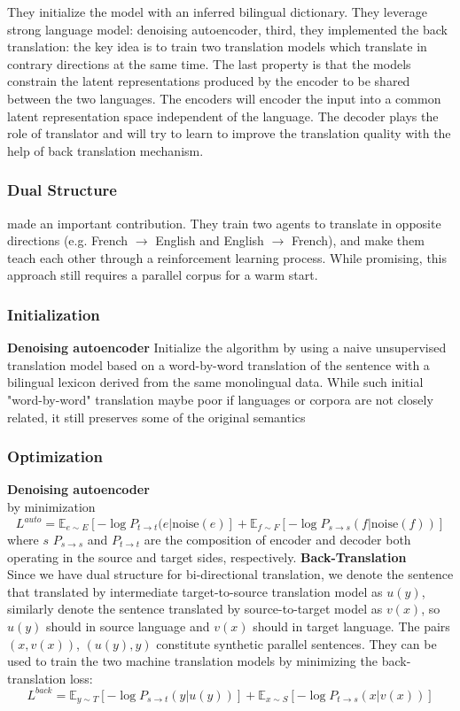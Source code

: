 They initialize the model with an inferred bilingual dictionary. They leverage strong language model: denoising autoencoder,  third, they implemented the back translation: the key idea is to train two translation models which translate in contrary directions at the same time. The last property is that the models constrain the latent representations produced by the encoder to be shared between the two languages. The encoders will encoder the input into a common latent representation space independent of the language. The decoder plays the role of translator and will try to learn to improve the translation quality with the help of back translation mechanism.

\subsubsection{Dual Structure}
made an important contribution. They train two agents to translate in opposite directions (e.g. French $\rightarrow$ English and English $\rightarrow$ French), and make them teach each other through a reinforcement learning process. While promising, this approach still requires a parallel corpus for a warm start.

\subsubsection{Initialization}
\textbf{Denoising autoencoder} Initialize the algorithm by using a naive unsupervised translation model based on a word-by-word translation of the sentence with a bilingual lexicon derived from the same monolingual data. While such initial "word-by-word" translation maybe poor if languages or corpora are not closely related, it still preserves some of the original semantics
\subsubsection{Optimization}
\textbf{Denoising autoencoder}\\
by minimization 
\[ L^{auto} = \mathbb{E}_{e\sim E}[-\log P_{t\rightarrow t}(e|\text{noise}(e)] + \mathbb{E}_{f\sim F} [-\log P_{s\rightarrow s}(f|\text{noise}(f))]\]
where $s$ $P_{s\rightarrow s}$ and $P_{t\rightarrow t}$ are the composition of encoder and decoder both operating in the source and target sides, respectively.
\textbf{Back-Translation}\\
Since we have dual structure for bi-directional translation, we denote the sentence that translated by intermediate target-to-source translation model as $u(y)$, similarly denote the sentence translated by source-to-target model as $v(x)$, so $u(y)$ should in source language and $v(x)$ should in target language. The pairs $(x, v(x))$, $(u(y), y)$ constitute synthetic parallel  sentences. They can be used to train the two machine translation models by minimizing the back-translation loss:
\[ L^{back} = \mathbb{E}_{y\sim T} [-\log P_{s\rightarrow t}(y|u(y))] +  \mathbb{E}_{x\sim S} [-\log P_{t\rightarrow s}(x|v(x))]\]

